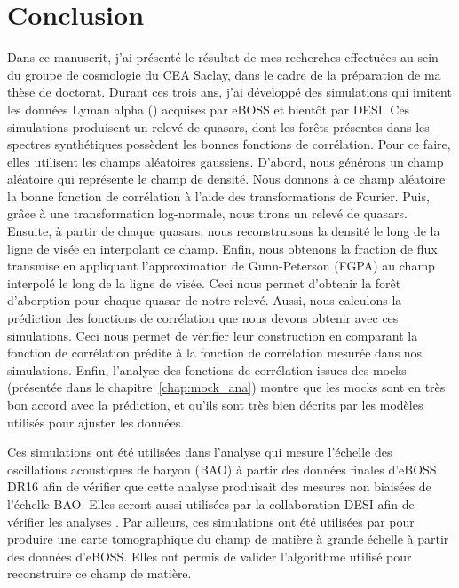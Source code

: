 \documentclass[11pt, twoside, a4paper, openright]{report}
\begin{document}
\graphicspath{ {../figures/mocks/} }


\chapter{Conclusion}
\thispagestyle{fancy}

Dans ce manuscrit, j'ai présenté le résultat de mes recherches effectuées au sein du groupe de cosmologie du CEA Saclay, dans le cadre de la préparation de ma thèse de doctorat.
Durant ces trois ans, j'ai développé des simulations qui imitent les données Lyman alpha (\lya{}) acquises par eBOSS et bientôt par DESI.
Ces simulations produisent un relevé de quasars, dont les forêts \lya{} présentes dans les spectres synthétiques possèdent les bonnes fonctions de corrélation.
Pour ce faire, elles utilisent les champs aléatoires gaussiens. D'abord, nous générons un champ aléatoire qui représente le champ de densité. Nous donnons à ce champ aléatoire la bonne fonction de corrélation à l'aide des transformations de Fourier.
Puis, grâce à une transformation log-normale, nous tirons un relevé de quasars. Ensuite, à partir de chaque quasars, nous reconstruisons la densité le long de la ligne de visée en interpolant ce champ. Enfin, nous obtenons la fraction de flux transmise en appliquant l'approximation de Gunn-Peterson (FGPA) au champ interpolé le long de la ligne de visée.
Ceci nous permet d'obtenir la forêt d'aborption \lya{} pour chaque quasar de notre relevé.
Aussi, nous calculons la prédiction des fonctions de corrélation que nous devons obtenir avec ces simulations. Ceci nous permet de vérifier leur construction en comparant la fonction de corrélation prédite à la fonction de corrélation mesurée dans nos simulations.
Enfin, l'analyse des fonctions de corrélation issues des mocks (présentée dans le chapitre~\ref{chap:mock_ana}) montre que les mocks sont en très bon accord avec la prédiction, et qu'ils sont très bien décrits par les modèles utilisés pour ajuster les données.


Ces simulations ont été utilisées dans l'analyse qui mesure l'échelle des oscillations acoustiques de baryon (BAO) à partir des données finales d'eBOSS DR16 \autocite{DuMasdesBourboux2020} afin de vérifier que cette analyse produisait des mesures non biaisées de l'échelle BAO. Elles seront aussi utilisées par la collaboration DESI afin de vérifier les analyses \lya{}.
Par ailleurs, ces simulations ont été utilisées par \textcite{Ravoux2020} pour produire une carte tomographique du champ de matière à grande échelle à partir des données d'eBOSS. Elles ont permis de valider l'algorithme utilisé pour reconstruire ce champ de matière.
\end{document}
